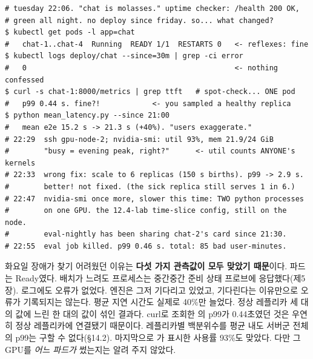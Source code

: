 \begin{terminalbox}
\begin{Verbatim}[breaklines=true,breakanywhere=true,fontsize=\small,formatcom=\color{tbbtermfg},codes=\tbbcodeactive]
# tuesday 22:06. "chat is molasses." uptime checker: /health 200 OK,
# green all night. no deploy since friday. so... what changed?
$ kubectl get pods -l app=chat
#   chat-1..chat-4  Running  READY 1/1  RESTARTS 0   <- reflexes: fine
$ kubectl logs deploy/chat --since=30m | grep -ci error
#   0                                                <- nothing confessed
$ curl -s chat-1:8000/metrics | grep ttft   # spot-check... ONE pod
#   p99 0.44 s. fine?!            <- you sampled a healthy replica
$ python mean_latency.py --since 21:00
#   mean e2e 15.2 s -> 21.3 s (+40%). "users exaggerate."
# 22:29  ssh gpu-node-2; nvidia-smi: util 93%, mem 21.9/24 GiB
#        "busy = evening peak, right?"      <- util counts ANYONE's kernels
# 22:33  wrong fix: scale to 6 replicas (150 s births). p99 -> 2.9 s.
#        better! not fixed. (the sick replica still serves 1 in 6.)
# 22:47  nvidia-smi once more, slower this time: TWO python processes
#        on one GPU. the 12.4-lab time-slice config, still on the node.
#        eval-nightly has been sharing chat-2's card since 21:30.
# 22:55  eval job killed. p99 0.46 s. total: 85 bad user-minutes.
\end{Verbatim}
\end{terminalbox}

화요일 장애가 찾기 어려웠던 이유는 \textbf{다섯 가지 관측값이 모두 맞았기 때문}이다. 파드는 Ready였다. 배치가 느려도 프로세스는 중간중간 준비 상태 프로브에 응답했다(제5장). 로그에도 오류가 없었다. 엔진은 그저 기다리고 있었고, 기다린다는 이유만으로 오류가 기록되지는 않는다. 평균 지연 시간도 실제로 40\%만 늘었다. 정상 레플리카 세 대의 값에 느린 한 대의 값이 섞인 결과다. curl로 조회한 의 p99가 0.44초였던 것은 우연히 정상 레플리카에 연결됐기 때문이다. 레플리카별 백분위수를 평균 내도 서버군 전체의 p99는 구할 수 없다(§14.2). 마지막으로 가 표시한 사용률 93\%도 맞았다. 다만 그 GPU를 \textit{어느 파드가} 썼는지는 알려 주지 않았다.

